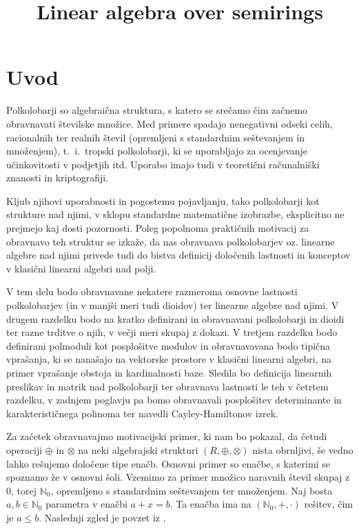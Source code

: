 \documentclass[mat1]{fmfdelo}
\title{Linear algebra over semirings}
\newcommand{\N}{\mathbb{N}}
\newcommand{\No}{\N_0}
\begin{document}

\tableofcontents

\section{Uvod}\label{sect:intro}
Polkolobarji so algebraična struktura, s katero se srečamo čim začnemo obravnavati številske množice. Med primere spadajo nenegativni odseki celih, racionalnih ter realnih števil (opremljeni s standardnim seštevanjem in množenjem), t.~i.~tropski polkolobarji, ki se uporabljajo za ocenjevanje učinkovitosti v podjetjih itd. Uporabo imajo tudi v teoretični računalniški znanosti in kriptografiji. 

Kljub njihovi uporabnosti in pogostemu pojavljanju, tako polkolobarji kot strukture nad njimi, v sklopu standardne matematične izobrazbe, eksplicitno ne prejmejo kaj dosti pozornosti. Poleg popolnoma praktičnih motivacij za obravnavo teh struktur se izkaže, da nas obravnava polkolobarjev oz. linearne algebre nad njimi privede tudi do bistva definicij določenih lastnosti in konceptov v klasični linearni algebri nad polji. 

V tem delu bodo obravnavane nekatere razmeroma osnovne lastnosti polkolobarjev (in v manjši meri tudi dioidov) ter linearne algebre nad njimi. V drugem razdelku bodo na kratko definirani in obravnavani polkolobarji in dioidi ter razne trditve o njih, v večji meri skupaj z dokazi. V tretjem razdelku bodo definirani polmoduli kot posplošitve modulov in obravnavavana bodo tipična vprašanja, ki se nanašajo na vektorske prostore v klasični linearni algebri, na primer vprašanje obstoja in kardinalnosti baze. Sledila bo definicija linearnih preslikav in matrik nad polkolobarji ter obravnava lastnosti le teh v četrtem razdelku, v zadnjem poglavju pa bomo obravnavali posplošitev determinante in karakterističnega polinoma ter navedli Cayley-Hamiltonov izrek.

Za začetek obravnavajmo motivacijski primer, ki nam bo pokazal, da četudi operaciji $\oplus$ in $\otimes$ na neki algebrajski strukturi $(R, \oplus, \otimes)$ nista obrnljivi, še vedno lahko rešujemo določene tipe enačb. Osnovni primer so enačbe, s katerimi se spoznamo že v osnovni šoli. Vzemimo za primer množico naravnih števil skupaj z $0$, torej $\No$, opremljeno s standardnim seštevanjem ter množenjem. Naj bosta $a, b\in \No$ parametra v enačbi $a + x = b$. Ta enačba ima na $(\No, +, \cdot)$ rešitev, čim je $a \leq b$. Naslednji zgled je povzet iz \cite[str. 1 -- 2]{bib:Gondran}.
\end{document}

